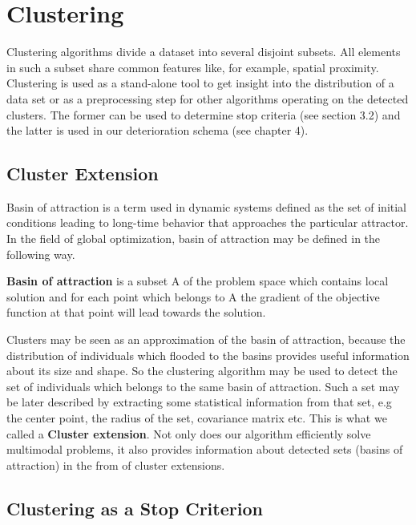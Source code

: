 
\chapter{Clustering}
\label{Clustering}

Clustering algorithms divide a dataset into several disjoint subsets. All elements in such
a subset share common features like, for example, spatial proximity.
Clustering is used as a stand-alone tool to get insight into the distribution
of a data set or as a preprocessing step for other algorithms operating on the
detected clusters. The former can be used to determine stop
criteria (see section 3.2) and the latter is used in our deterioration
schema (see chapter 4).

\section{Cluster Extension}

Basin of attraction is a term used in dynamic systems
defined as the set of initial conditions leading to long-time 
behavior that approaches the particular attractor.
In the field of global optimization, basin of attraction may
be defined in the following way.

\begin{definition}\label{def:basin}
\textbf{Basin of attraction} is a subset A of the problem space which contains
local solution and for each point which belongs to A the gradient of the objective
function at that point will lead towards the solution.
\end{definition}

Clusters may be seen as an approximation of the basin of attraction, because
the distribution of individuals which flooded to the basins
provides useful information about its size and shape. So the clustering 
algorithm may be used to detect the set of individuals which belongs
to the same basin of attraction. Such a set may be later described by extracting
some statistical information from that set, e.g the center point,  
the radius of the set, covariance matrix etc. This is what we called
a \textbf{Cluster extension}. 
Not only does our algorithm efficiently solve multimodal problems, it also
provides information about detected sets (basins of attraction) in the from 
of cluster extensions. 

\section{Clustering as a Stop Criterion}

